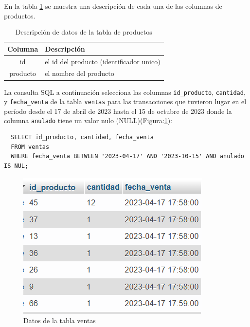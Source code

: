En la tabla \ref{tab:productos} se muestra una descripción de cada una de las columnas de productos.

\begin{table}[H]

  \begin{tabular}{|c|l|}  %
    \hline
    \rowcolor{gray!50} \textbf{Columna} & \textbf{Descripción} \\
    \hline
    id &  el id del producto (identificador unico)\\
    producto & el nombre del producto \\
    \hline
  \end{tabular}
  \centering
  \caption{ Descripción de datos de la tabla de productos}
  \label{tab:productos} %
\end{table}

La consulta SQL a continuación selecciona las columnas \texttt{id\_producto}, \texttt{cantidad}, y \texttt{fecha\_venta} de la tabla \texttt{ventas} para las transacciones que tuvieron lugar en el período desde el 17 de abril de 2023 hasta el 15 de octubre de 2023 donde la columna \texttt{anulado} tiene un valor nulo (NULL)(Figura:\ref{fig:fecha_venta}):

\begin{verbatim}
  SELECT id_producto, cantidad, fecha_venta
  FROM ventas
  WHERE fecha_venta BETWEEN '2023-04-17' AND '2023-10-15' AND anulado IS NUL;
\end{verbatim}
\begin{figure}[H]
  \begin{center}
    \includegraphics[scale=0.90]{./ventas_fecha.png}
    \caption{Datos de la tabla ventas}
    \label{fig:fecha_venta}
  \end{center}
\end{figure}

